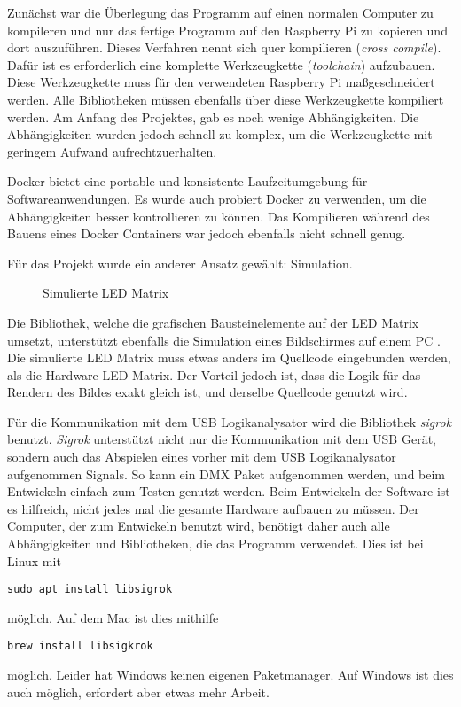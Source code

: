 Zunächst war die Überlegung das Programm auf einen normalen Computer zu kompileren und nur das fertige Programm auf den Raspberry Pi zu kopieren und dort auszuführen. Dieses Verfahren nennt sich quer kompilieren (\emph{cross compile}). Dafür ist es erforderlich eine komplette Werkzeugkette (\emph{toolchain}) aufzubauen. Diese Werkzeugkette muss für den verwendeten Raspberry Pi maßgeschneidert werden. Alle Bibliotheken müssen ebenfalls über diese Werkzeugkette kompiliert werden. Am Anfang des Projektes, gab es noch wenige Abhängigkeiten. Die Abhängigkeiten wurden jedoch schnell zu komplex, um die Werkzeugkette mit geringem Aufwand aufrechtzuerhalten.

Docker bietet eine portable und konsistente Laufzeitumgebung für Softwareanwendungen. Es wurde auch probiert Docker zu verwenden, um die Abhängigkeiten besser kontrollieren zu können. Das Kompilieren während des Bauens eines Docker Containers war jedoch ebenfalls nicht schnell genug.

Für das Projekt wurde ein anderer Ansatz gewählt: Simulation.

\begin{figure}[H]
	\centering
	\caption{Simulierte LED Matrix \cite{githubEmbedded-graphicsSimulator}}
\end{figure}


Die Bibliothek, welche die grafischen Bausteinelemente auf der LED Matrix umsetzt, unterstützt ebenfalls die Simulation eines Bildschirmes auf einem PC \cite{githubEmbedded-graphicsSimulator}. Die simulierte LED Matrix muss etwas anders im Quellcode eingebunden werden, als die Hardware LED Matrix. Der Vorteil jedoch ist, dass die Logik für das Rendern des Bildes exakt gleich ist, und derselbe Quellcode genutzt wird.

Für die Kommunikation mit dem USB Logikanalysator wird die Bibliothek \emph{sigrok} \cite{githubLibsigrok} benutzt. \emph{Sigrok} unterstützt nicht nur die Kommunikation mit dem USB Gerät, sondern auch das Abspielen eines vorher  mit dem USB Logikanalysator aufgenommen Signals. So kann ein DMX Paket aufgenommen werden, und beim Entwickeln einfach zum Testen genutzt werden. Beim Entwickeln der Software ist es hilfreich, nicht jedes mal die gesamte Hardware aufbauen zu müssen. Der Computer, der zum Entwickeln benutzt wird, benötigt daher auch alle Abhängigkeiten und Bibliotheken, die das Programm verwendet. Dies ist bei Linux mit \begin{verbatim}sudo apt install libsigrok\end{verbatim} möglich. Auf dem Mac ist dies mithilfe \begin{verbatim}brew install libsigkrok\end{verbatim} möglich. Leider hat Windows keinen eigenen Paketmanager. Auf Windows ist dies auch möglich, erfordert aber etwas mehr Arbeit.

